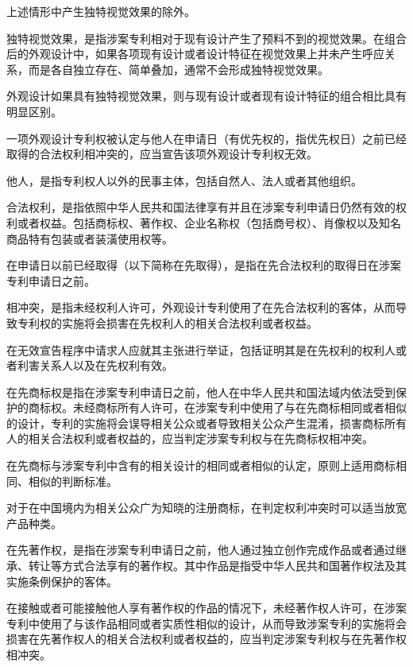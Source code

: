 上述情形中产生独特视觉效果的除外。

独特视觉效果，是指涉案专利相对于现有设计产生了预料不到的视觉效果。在组合后的外观设计中，如果各项现有设计或者设计特征在视觉效果上并未产生呼应关系，而是各自独立存在、简单叠加，通常不会形成独特视觉效果。

外观设计如果具有独特视觉效果，则与现有设计或者现有设计特征的组合相比具有明显区别。

一项外观设计专利权被认定与他人在申请日（有优先权的，指优先权日）之前已经取得的合法权利相冲突的，应当宣告该项外观设计专利权无效。

他人，是指专利权人以外的民事主体，包括自然人、法人或者其他组织。

合法权利，是指依照中华人民共和国法律享有并且在涉案专利申请日仍然有效的权利或者权益。包括商标权、著作权、企业名称权（包括商号权）、肖像权以及知名商品特有包装或者装潢使用权等。

在申请日以前已经取得（以下简称在先取得），是指在先合法权利的取得日在涉案专利申请日之前。

相冲突，是指未经权利人许可，外观设计专利使用了在先合法权利的客体，从而导致专利权的实施将会损害在先权利人的相关合法权利或者权益。

在无效宣告程序中请求人应就其主张进行举证，包括证明其是在先权利的权利人或者利害关系人以及在先权利有效。

在先商标权是指在涉案专利申请日之前，他人在中华人民共和国法域内依法受到保护的商标权。未经商标所有人许可，在涉案专利中使用了与在先商标相同或者相似的设计，专利的实施将会误导相关公众或者导致相关公众产生混淆，损害商标所有人的相关合法权利或者权益的，应当判定涉案专利权与在先商标权相冲突。

在先商标与涉案专利中含有的相关设计的相同或者相似的认定，原则上适用商标相同、相似的判断标准。

对于在中国境内为相关公众广为知晓的注册商标，在判定权利冲突时可以适当放宽产品种类。

在先著作权，是指在涉案专利申请日之前，他人通过独立创作完成作品或者通过继承、转让等方式合法享有的著作权。其中作品是指受中华人民共和国著作权法及其实施条例保护的客体。

在接触或者可能接触他人享有著作权的作品的情况下，未经著作权人许可，在涉案专利中使用了与该作品相同或者实质性相似的设计，从而导致涉案专利的实施将会损害在先著作权人的相关合法权利或者权益的，应当判定涉案专利权与在先著作权相冲突。

